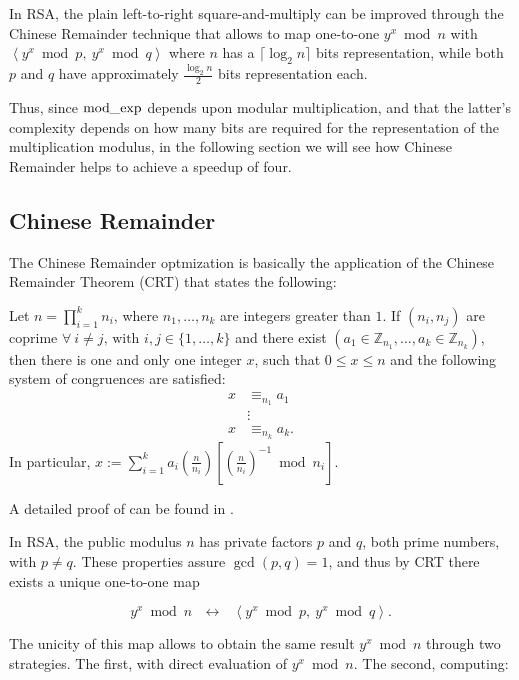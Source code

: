 In RSA, the plain left-to-right square-and-multiply can be improved through the Chinese Remainder technique that allows to map one-to-one $y^x \bmod n$ with $ \left< y^x \bmod p,\ y^x \bmod q \right>$ where $n$ has a $\lceil \log_2n \rceil$ bits representation, while both $p$ and $q$ have approximately $\frac{\log_2n}{2}$ bits representation each.

Thus, since $\operatorname{mod\_exp}$ depends upon modular multiplication, and that the latter's complexity depends on how many bits are required for the representation of the multiplication modulus, in the following section we will see how Chinese Remainder helps to achieve a speedup of four.

\subsection{Chinese Remainder}

The Chinese Remainder optmization is basically the application of the Chinese Remainder Theorem (CRT) that states the following:

\begin{theorem}\label{theorem:one}
Let $n = \prod_{i = 1}^{k}n_i$, where $n_1, \ldots, n_k$ are integers greater than $1$. If $(n_i, n_j)$ are coprime $\forall\ i \neq j \text{, with } i, j \in \{1, \dots, k\}$ and there exist $\left( a_1 \in \mathbb{Z}_{n_1}, \dots, a_k \in \mathbb{Z}_{n_k} \right)$, then there is one and only one integer $x$, such that $0 \leq x \leq n$ and the following system of congruences are satisfied:
\begin{align*}
  x &\equiv_{n_1} a_1 \\
    & \vdots \\
  x &\equiv_{n_k} a_k.
\end{align*}
In particular, $ x :=  \sum\limits_{i = 1}^{k} a_i \left( \frac{n}{n_i} \right) \left[ \left( \frac{n}{n_i} \right) ^{-1} \bmod n_i \right] $.
\end{theorem}

A detailed proof of  can be found in \cite{bib:boreale}.

In RSA, the public modulus $n$ has private factors $p$ and $q$, both prime numbers, with $p \neq q$. These properties assure $\gcd(p, q) = 1$, and thus by CRT there exists a unique one-to-one map

$$ y^x \bmod n \text{ } \longleftrightarrow \text{ } \left< y^x \bmod p,\ y^x \bmod q \right>. $$

The unicity of this map allows to obtain the same result $y^x \bmod n$ through two strategies. The first, with direct evaluation of $y^x \bmod n$. The second, computing:

